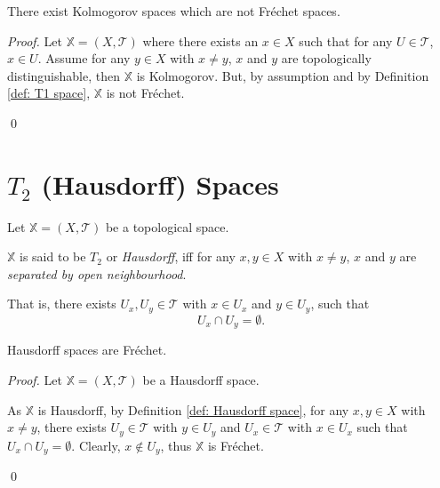 \begin{proposition}
	There exist Kolmogorov spaces which are not Fr\'echet spaces.
	
	\begin{proof}
		Let $\mathbb X = (X, \mathcal T)$ where there exists an $x \in X$ such that for any $U \in \mathcal T$, $x \in U$. Assume for any $y \in X$ with $x \ne y$, $x$ and $y$ are topologically distinguishable, then $\mathbb X$ is Kolmogorov. But, by assumption and by Definition \ref{def: T1 space}, $\mathbb X$ is not Fr\'echet.
		
		\qed
	\end{proof}
\end{proposition}


\section{$T_2$ (Hausdorff) Spaces}


\begin{definition}
	\label{def: Hausdorff space}
	Let $\mathbb X = (X, \mathcal T)$ be a topological space.
	
	$\mathbb X$ is said to be $T_2$ or \textit{Hausdorff}, iff for any $x, y \in X$ with $x \ne y$, $x$ and $y$ are \textit{separated by open neighbourhood}.
	
	That is, there exists $U_x, U_y \in \mathcal T$ with $x \in U_x$ and $y \in U_y$, such that
	$$
	U_x \cap U_y = \emptyset.
	$$
\end{definition}


\begin{proposition}
	Hausdorff spaces are Fr\'echet.
	
	\begin{proof}
		Let $\mathbb X = (X, \mathcal T)$ be a Hausdorff space.
		
		As $\mathbb X$ is Hausdorff, by Definition \ref{def: Hausdorff space}, for any $x,y \in X$ with $x \ne y$, there exists $U_y \in \mathcal T$ with $y \in U_y$ and $U_x \in \mathcal T$ with $x \in U_x$ such that $U_x \cap U_y = \emptyset$. Clearly, $x \notin U_y$, thus $\mathbb X$ is Fr\'echet.
		
		\qed
	\end{proof}
\end{proposition}


